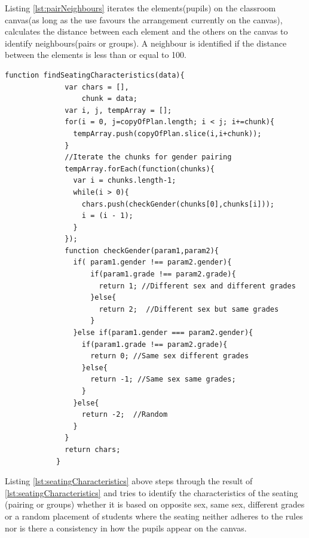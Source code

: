 Listing \ref{lst:pairNeighbours} iterates the elements(pupils) on the classroom canvas(as long as the use favours the arrangement currently on the canvas), calculates the distance between each element and the others on the canvas to identify neighbours(pairs or groups). A neighbour is identified if the distance between the elements is less than or equal to 100.

\begin{lstlisting}[caption={Looks for seating characteristics}, label={lst:seatingCharacteristics}]
            function findSeatingCharacteristics(data){
              var chars = [],
                  chunk = data;
              var i, j, tempArray = [];
              for(i = 0, j=copyOfPlan.length; i < j; i+=chunk){
                tempArray.push(copyOfPlan.slice(i,i+chunk));
              }
              //Iterate the chunks for gender pairing
              tempArray.forEach(function(chunks){
                var i = chunks.length-1;
                while(i > 0){
                  chars.push(checkGender(chunks[0],chunks[i]));
                  i = (i - 1);
                }
              });
              function checkGender(param1,param2){
                if( param1.gender !== param2.gender){
                    if(param1.grade !== param2.grade){
                      return 1; //Different sex and different grades
                    }else{
                      return 2;  //Different sex but same grades
                    }
                }else if(param1.gender === param2.gender){
                  if(param1.grade !== param2.grade){
                    return 0; //Same sex different grades
                  }else{
                    return -1; //Same sex same grades;
                  }
                }else{
                  return -2;  //Random
                }
              }
              return chars;
            }
\end{lstlisting}
Listing \ref{lst:seatingCharacteristics} above steps through the result of \ref{lst:seatingCharacteristics} and tries to identify the characteristics of the seating (pairing or groups) whether it is based on opposite sex, same sex, different grades or a random placement of students where the seating neither adheres to the rules nor is there a consistency in how the pupils appear on the canvas.

